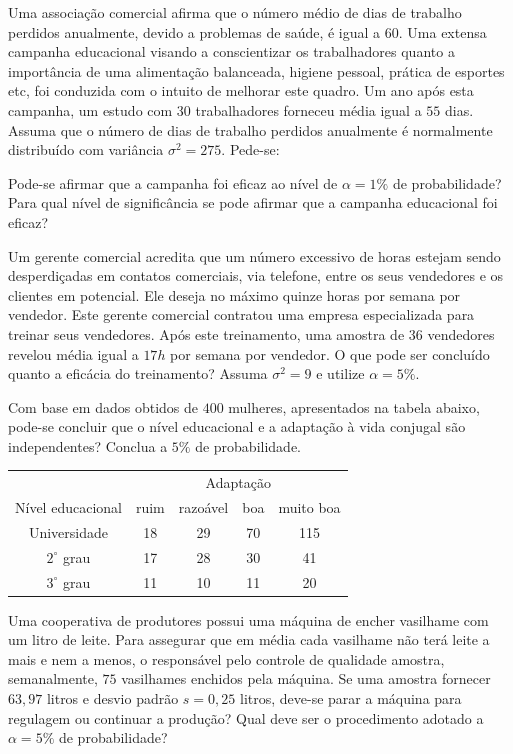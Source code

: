 \documentclass{report}
\begin{document}
\begin{Exercise}
\Question Uma associação comercial afirma que o número médio de dias de trabalho perdidos anualmente, devido a problemas de saúde, é igual a 60. Uma extensa 
campanha educacional visando a conscientizar os trabalhadores quanto a importância de uma alimentação balanceada, higiene pessoal, prática de esportes 
etc, foi conduzida com o intuito de melhorar este quadro. Um ano após esta campanha, um estudo com $30$ trabalhadores forneceu média igual a $55$ dias. Assuma 
que o número de dias de trabalho perdidos anualmente é normalmente distribuído com variância $\sigma^{2}=275$. Pede-se:
\begin{tasks}
\task Pode-se afirmar que a campanha foi eficaz ao nível de $\alpha=1\%$ de probabilidade?
\task Para qual nível de significância se pode afirmar que a campanha educacional foi eficaz?
\end{tasks}

\Question Um gerente comercial acredita que um número excessivo de horas estejam sendo desperdiçadas em contatos comerciais, via telefone, entre os seus 
vendedores e os clientes em potencial. Ele deseja no máximo quinze horas por semana por vendedor. Este gerente comercial contratou uma empresa especializada 
para treinar seus vendedores. Após este treinamento, uma amostra de $36$ vendedores revelou média igual a $17h$ por semana por vendedor. O que pode ser concluído 
quanto a eficácia do treinamento? Assuma $\sigma^{2}=9$ e utilize $\alpha=5\%.$

\Question Com base em dados obtidos de $400$ mulheres, apresentados na tabela abaixo, pode-se concluir que o nível educacional e a adaptação à vida conjugal 
são independentes? Conclua a $5\%$ de probabilidade.

\begin{table}[H]
\centering
\begin{tabular}{ccccc}
\hline \hline
                                      &\multicolumn{4}{c}{Adaptação}\\
																			\cline{2-5}
Nível educacional&ruim&razoável&boa&muito boa\\
\hline\hline
         Universidade& 18  &29 & 70 & 115      \\
$2^{\circ}$ grau     & 17  &28 & 30 &    41     \\
$3^{\circ}$ grau     & 11  &10 & 11 &    20     \\
\hline
\end{tabular}
\end{table}

\Question Uma cooperativa de produtores possui uma máquina de encher vasilhame com um litro de leite. Para assegurar que em média cada vasilhame não terá 
leite a mais e nem a menos, o responsável pelo controle de qualidade amostra, semanalmente, $75$ vasilhames enchidos pela máquina. Se uma amostra fornecer 
$63,97$ litros e desvio padrão $s=0,25$ litros, deve-se parar a máquina para regulagem ou continuar a produção? Qual deve ser o procedimento adotado a $\alpha=5\%$ 
de probabilidade?


\end{Exercise}
\end{document}
